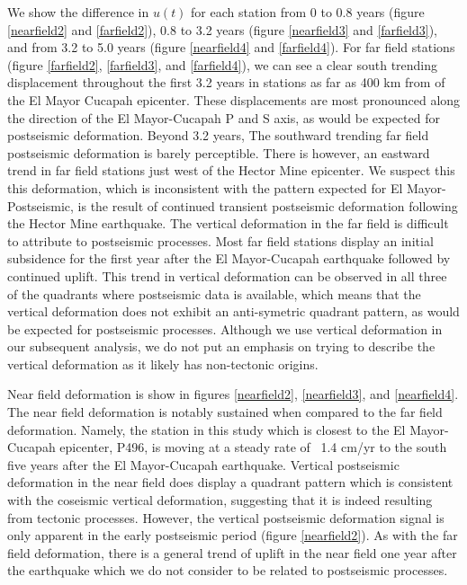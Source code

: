 \documentclass[12pt]{article}
\begin{document}
We show the difference in $u(t)$ for each station from 0 to 0.8 years (figure \ref{nearfield2} and \ref{farfield2}), 0.8 to 3.2 years (figure \ref{nearfield3} and \ref{farfield3}), and from 3.2 to 5.0 years (figure \ref{nearfield4} and \ref{farfield4}).  For far field stations (figure \ref{farfield2}, \ref{farfield3}, and \ref{farfield4}), we can see a clear south trending displacement throughout the first 3.2 years in stations as far as 400 km from of the El Mayor Cucapah epicenter.  These displacements are most pronounced along the direction of the El Mayor-Cucapah P and S axis, as would be expected for postseismic deformation.  Beyond 3.2 years, The southward trending far field postseismic deformation is barely perceptible. There is however, an eastward trend in far field stations just west of the Hector Mine epicenter.  We suspect this this deformation, which is inconsistent with the pattern expected for El Mayor-Postseismic, is the result of continued transient postseismic deformation following the Hector Mine earthquake.  The vertical deformation in the far field is difficult to attribute to postseismic processes.  Most far field stations display an initial subsidence for the first year after the El Mayor-Cucapah earthquake followed by continued uplift.  This trend in vertical deformation can be observed in all three of the quadrants where postseismic data is available, which means that the vertical deformation does not exhibit an anti-symetric quadrant pattern, as would be expected for postseismic processes.  Although we use vertical deformation in our subsequent analysis, we do not put an emphasis on trying to describe the vertical deformation as it likely has non-tectonic origins.        

Near field deformation is show in figures \ref{nearfield2}, \ref{nearfield3}, and \ref{nearfield4}.  The near field deformation is notably sustained when compared to the far field deformation.  Namely, the station in this study which is closest to the El Mayor-Cucapah epicenter, P496, is moving at a steady rate of ~1.4 cm/yr to the south five years after the El Mayor-Cucapah earthquake.  Vertical postseismic deformation in the near field does display a quadrant pattern which is consistent with the coseismic vertical deformation, suggesting that it is indeed resulting from tectonic processes.  However, the vertical postseismic deformation signal is only apparent in the early postseismic period (figure \ref{nearfield2}).  As with the far field deformation, there is a general trend of uplift in the near field one year after the earthquake which we do not consider to be related to postseismic processes.  
\end{document}
